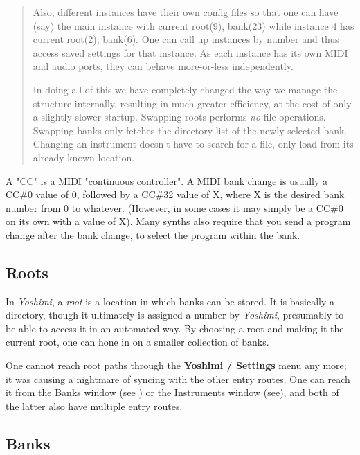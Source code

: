 \begin{quotation}
      Also, different instances have their own config files so that one can
      have (say) the main instance with current root(9), bank(23) while
      instance 4 has current root(2), bank(6). One can call up instances by
      number and thus access saved settings for that instance. As each
      instance has its own MIDI and audio ports, they can behave
      more-or-less independently.

      In doing all of this we have completely changed the way we manage the
      structure internally, resulting in much greater efficiency, at the
      cost of only a slightly slower startup. Swapping roots performs
      \textsl{no}
      file operations. Swapping banks only fetches the directory list of the
      newly selected bank. Changing an instrument doesn't have to search for
      a file, only load from its already known location.
   \end{quotation}

   A "CC" is a MIDI "continuous controller".
   A MIDI bank change is usually a CC\#0 value of 0, followed by a CC\#32
   value of X, where X is the desired bank number from 0 to whatever.
   (However, in some cases it may simply be a CC\#0 on its own with a value
    of X).  Many synths also require that you send a program change after
   the bank change, to select the program within the bank. 

\subsection{Roots}
\label{subsec:banks_and_roots_roots}

   In \textsl{Yoshimi}, a \textsl{root} is a location in which banks can be
   stored.  It is basically a directory, though it ultimately is assigned a
   number by \textsl{Yoshimi}, presumably to be able to access it in an
   automated way.  By choosing a root and making it the current root, one
   can hone in on a smaller collection of banks.

   One cannot reach root paths through the \textbf{Yoshimi / Settings} menu
   any more; it was causing a nightmare of syncing with the other entry
   routes. One can reach it from the Banks window
   (see )
   or the Instruments window
   (see),
   and both of the latter also have multiple entry routes.

\subsection{Banks}
\label{subsec:banks_and_roots_banks}
   
